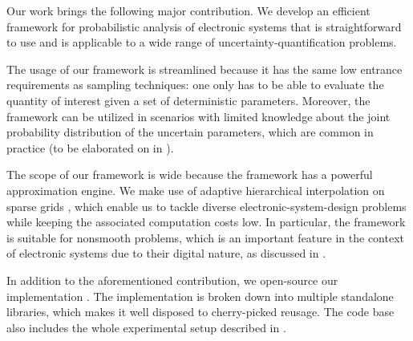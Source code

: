 Our work brings the following major contribution. We develop an efficient
framework for probabilistic analysis of electronic systems that is
straightforward to use and is applicable to a wide range of
uncertainty-quantification problems.

The usage of our framework is streamlined because it has the same low entrance
requirements as sampling techniques: one only has to be able to evaluate the
quantity of interest given a set of deterministic parameters. Moreover, the
framework can be utilized in scenarios with limited knowledge about the joint
probability distribution of the uncertain parameters, which are common in
practice (to be elaborated on in ).

The scope of our framework is wide because the framework has a powerful
approximation engine. We make use of adaptive hierarchical interpolation on
sparse grids \cite{jakeman2012, klimke2006, ma2009}, which enable us to tackle
diverse electronic-system-design problems while keeping the associated
computation costs low. In particular, the framework is suitable for nonsmooth
problems, which is an important feature in the context of electronic systems due
to their digital nature, as discussed in .

In addition to the aforementioned contribution, we open-source our
implementation \cite{sources}. The implementation is broken down into multiple
standalone libraries, which makes it well disposed to cherry-picked reusage. The
code base also includes the whole experimental setup described in
.
